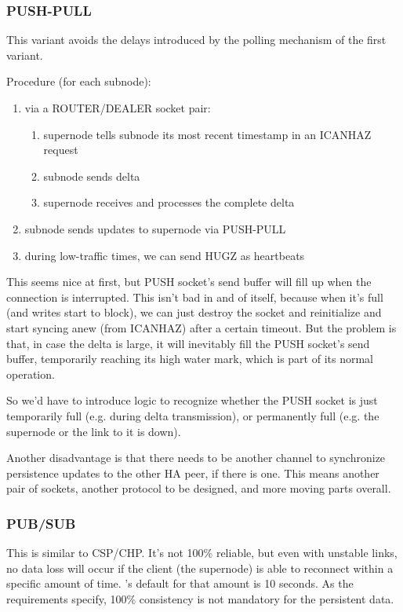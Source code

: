 \subsubsection{PUSH-PULL}
This variant avoids the delays introduced by the polling mechanism of the first variant.

Procedure (for each subnode):
\begin{enumerate}
	\item via a ROUTER/DEALER socket pair:
		\begin{enumerate}
			\item supernode tells subnode its most recent timestamp in an ICANHAZ request
			\item subnode sends delta
			\item supernode receives and processes the complete delta
		\end{enumerate}
	\item subnode sends updates to supernode via PUSH-PULL
	\item during low-traffic times, we can send HUGZ as heartbeats
\end{enumerate}

This seems nice at first, but PUSH socket's send buffer will fill up when the
connection is interrupted.  This isn't bad in and of itself, because when it's
full (and writes start to block), we can just destroy the socket and
reinitialize and start syncing anew (from ICANHAZ) after a certain timeout.
But the problem is that, in case the delta is large, it will inevitably fill
the PUSH socket's send buffer, temporarily reaching its high water mark, which
is part of its normal operation.

So we'd have to introduce logic to recognize whether the PUSH
socket is just temporarily full (e.g. during delta transmission), or
permanently full (e.g. the supernode or the link to it is down).

Another disadvantage is that there needs to be another channel to synchronize
persistence updates to the other HA peer, if there is one. This means another
pair of sockets, another protocol to be designed, and more moving parts
overall.

\subsubsection{PUB/SUB}
This is similar to CSP/CHP. It's not 100\% reliable, but even with unstable
links, no data loss will occur if the client (the supernode) is able to reconnect within a
specific amount of time. \zmq's default for that amount is 10 seconds. As the
requirements specify, 100\% consistency is not mandatory for the persistent
data.

